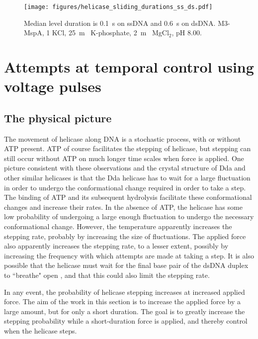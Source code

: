\begin{figure}[h]
\begin{centering}
\texttt{[image: figures/helicase\_sliding\_durations\_ss\_ds.pdf]}
\caption[Forced helicase stepping depends on temperature]{Median level duration is \SI{0.1}{\s} on ssDNA and \SI{0.6}{\s} on dsDNA.  M3-MspA, \SI{1}{\Molar} KCl, \SI{25}{\m\Molar} K-phosphate, \SI{2}{\m\Molar} MgCl$_2$, pH \num{8.00}.}
\label{fig:helicase_stepping_hist_ss_ds}
\end{centering}
\end{figure}


\section{Attempts at temporal control using voltage pulses}

\subsection{The physical picture}

The movement of helicase along DNA is a stochastic process, with or without ATP present.  ATP of course facilitates the stepping of helicase, but stepping can still occur without ATP on much longer time scales when force is applied.  One picture consistent with these observations and the crystal structure of Dda and other similar helicases is that the Dda helicase has to wait for a large fluctuation in order to undergo the conformational change required in order to take a step.  The binding of ATP and its subsequent hydrolysis facilitate these conformational changes and increase their rates.  In the absence of ATP, the helicase has some low probability of undergoing a large enough fluctuation to undergo the necessary conformational change.  However, the temperature apparently increases the stepping rate, probably by increasing the size of fluctuations.  The applied force also apparently increases the stepping rate, to a lesser extent, possibly by increasing the frequency with which attempts are made at taking a step.  It is also possible that the helicase must wait for the final base pair of the dsDNA duplex to ``breathe" open \citep{Jose2009}, and that this could also limit the stepping rate.

In any event, the probability of helicase stepping increases at increased applied force.  The aim of the work in this section is to increase the applied force by a large amount, but for only a short duration.  The goal is to greatly increase the stepping probability while a short-duration force is applied, and thereby control when the helicase steps.

